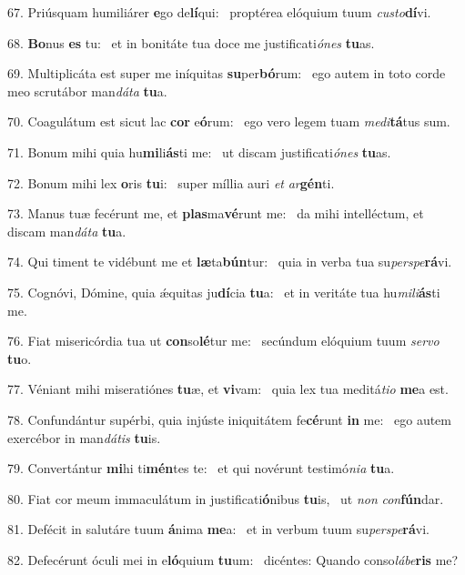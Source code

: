 67. Priúsquam humiliárer \textbf{e}go de\textbf{lí}qui: \ast\  proptérea elóquium tuum \textit{cus}\textit{to}\textbf{dí}vi.\

68. \textbf{Bo}nus \textbf{es} tu: \ast\  et in bonitáte tua doce me justificati\textit{ó}\textit{nes} \textbf{tu}as.\

69. Multiplicáta est super me iníquitas \textbf{su}per\textbf{bó}rum: \ast\  ego autem in toto corde meo scrutábor man\textit{dá}\textit{ta} \textbf{tu}a.\

70. Coagulátum est sicut lac \textbf{cor} e\textbf{ó}rum: \ast\  ego vero legem tuam \textit{me}\textit{di}\textbf{tá}tus sum.\

71. Bonum mihi quia hu\textbf{mi}li\textbf{ás}ti me: \ast\  ut discam justificati\textit{ó}\textit{nes} \textbf{tu}as.\

72. Bonum mihi lex \textbf{o}ris \textbf{tu}i: \ast\  super míllia auri \textit{et} \textit{ar}\textbf{gén}ti.\

73. Manus tuæ fecérunt me, et \textbf{plas}ma\textbf{vé}runt me: \ast\  da mihi intelléctum, et discam man\textit{dá}\textit{ta} \textbf{tu}a.\

74. Qui timent te vidébunt me et \textbf{læ}ta\textbf{bún}tur: \ast\  quia in verba tua su\textit{per}\textit{spe}\textbf{rá}vi.\

75. Cognóvi, Dómine, quia ǽquitas ju\textbf{dí}cia \textbf{tu}a: \ast\  et in veritáte tua hu\textit{mi}\textit{li}\textbf{ás}ti me.\

76. Fiat misericórdia tua ut \textbf{con}so\textbf{lé}tur me: \ast\  secúndum elóquium tuum \textit{ser}\textit{vo} \textbf{tu}o.\

77. Véniant mihi miseratiónes \textbf{tu}æ, et \textbf{vi}vam: \ast\  quia lex tua meditá\textit{ti}\textit{o} \textbf{me}a est.\

78. Confundántur supérbi, quia injúste iniquitátem fe\textbf{cé}runt \textbf{in} me: \ast\  ego autem exercébor in man\textit{dá}\textit{tis} \textbf{tu}is.\

79. Convertántur \textbf{mi}hi ti\textbf{mén}tes te: \ast\  et qui novérunt testimó\textit{ni}\textit{a} \textbf{tu}a.\

80. Fiat cor meum immaculátum in justificati\textbf{ó}nibus \textbf{tu}is, \ast\  ut \textit{non} \textit{con}\textbf{fún}dar.\

81. Defécit in salutáre tuum \textbf{á}nima \textbf{me}a: \ast\  et in verbum tuum su\textit{per}\textit{spe}\textbf{rá}vi.\

82. Defecérunt óculi mei in e\textbf{ló}quium \textbf{tu}um: \ast\  dicéntes: Quando conso\textit{lá}\textit{be}\textbf{ris} me?\

